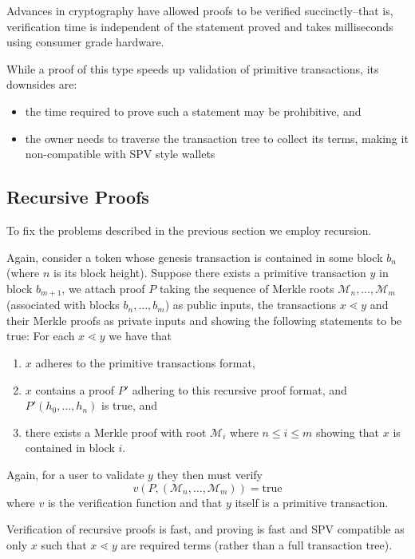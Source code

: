 \documentclass[9pt,oneside]{amsart}
\begin{document}
\begin{multicols}{2}
Advances in cryptography have allowed proofs to be verified succinctly--that is, verification time is independent of the statement proved and takes milliseconds using consumer grade hardware.


While a proof of this type speeds up validation of primitive transactions, its downsides are:
\begin{itemize}
    \item the time required to prove such a statement may be prohibitive, and
    \item the owner needs to traverse the transaction tree to collect its terms, making it non-compatible with SPV style wallets
\end{itemize}

\subsection{Recursive Proofs}
To fix the problems described in the previous section we employ recursion.

Again, consider a token whose genesis transaction is contained in some block $b_{n}$ (where $n$ is its block height). Suppose there exists a primitive transaction $y$ in block $b_{m+1}$, we attach proof $P$ taking the sequence of Merkle roots $\mathcal{M}_{n}, \dots, \mathcal{M}_{m}$ (associated with blocks $b_{n}, \dots, b_{m}$) as public inputs, the transactions $x \lessdot y$ and their Merkle proofs as private inputs and showing the following statements to be true:
For each $x \lessdot y$ we have that
\begin{enumerate}
    \item $x$ adheres to the primitive transactions format,
    \item $x$ contains a proof $P'$ adhering to this recursive proof format, and $P'(h_{0}, \dots, h_{n})$ is true, and
    \item there exists a Merkle proof with root $\mathcal{M}_{i}$ where $n \leq i \leq m$ showing that $x$ is contained in block $i$.
\end{enumerate}

Again, for a user to validate $y$ they then must verify
\[v(P, (\mathcal{M}_{n}, \dots, \mathcal{M}_{m})) = \text{true}\]
where $v$ is the verification function and that $y$ itself is a primitive transaction.

Verification of recursive proofs is fast, and proving is fast and SPV compatible as only $x$ such that $x \lessdot y$ are required terms (rather than a full transaction tree).


\end{multicols}
\end{document}
